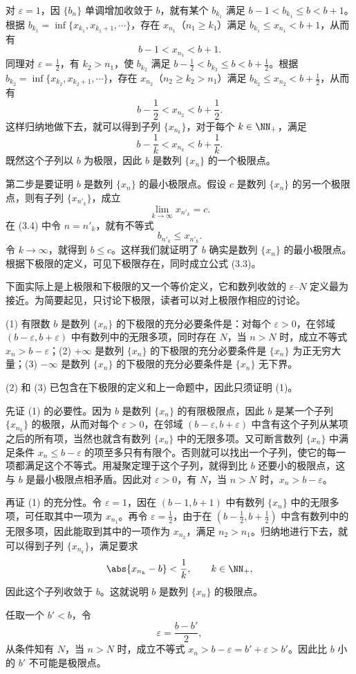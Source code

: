 \begin{xproof}
对 $\varepsilon=1$，因 $\{b_n\}$ 单调增加收敛于 $b$，就有某个 $b_{k_1}$ 满足 $b-1<b_{k_1}\leqslant b<b+1$。根据 $b_{k_1}=\inf\{x_{k_1},x_{k_1+1},\cdots\}$，存在 $x_{n_1}$（$n_1\geqslant k_1$）满足 $b_{k_1}\leqslant x_{n_1}<b+1$，从而有
\[
  b-1<x_{n_1}<b+1.
\]
同理对 $\varepsilon=\frac12$，有 $k_2>n_1$，使 $b_{k_2}$ 满足 $b-\frac12<b_{k_2}\leqslant b<b+\frac12$。根据 $b_{k_2}=\inf\{x_{k_2},x_{k_2+1},\cdots\}$，存在 $x_{n_2}$（$n_2\geqslant k_2>n_1$）满足 $b_{k_2}\leqslant x_{n_2}<b+\frac12$，从而有
\[
  b-\frac12<x_{n_2}<b+\frac12.
\]
这样归纳地做下去，就可以得到子列 $\{x_{n_k}\}$，对于每个 $k\in\NN_+$，满足
\[
  b-\frac1k<x_{n_k}<b+\frac1k.
\]
既然这个子列以 $b$ 为极限，因此 $b$ 是数列 $\{x_n\}$ 的一个极限点。

第二步是要证明 $b$ 是数列 $\{x_n\}$ 的最小极限点。假设 $c$ 是数列 $\{x_n\}$ 的另一个极限点，则有子列 $\{x_{n'_k}\}$，成立
\[
  \lim_{k\to\infty}x_{n'_k}=c.
\]
在 (3.4) 中令 $n=n'_k$，就有不等式
\[
  b_{n'_k}\leqslant x_{n'_k}.
\]
令 $k\to\infty$，就得到 $b\leqslant c$。这样我们就证明了 $b$ 确实是数列 $\{x_n\}$ 的最小极限点。根据下极限的定义，可见下极限存在，同时成立公式 (3.3)。
\end{xproof}

下面实际上是上极限和下极限的又一个等价定义，它和数列收敛的 $\varepsilon$--$N$ 定义最为接近。为简要起见，只讨论下极限，读者可以对上极限作相应的讨论。

\begin{xproposition}[3.6.3]
(1) 有限数 $b$ 是数列 $\{x_n\}$ 的下极限的充分必要条件是：对每个 $\varepsilon>0$，在邻域 $(b-\varepsilon,b+\varepsilon)$ 中有数列中的无限多项，同时存在 $N$，当 $n>N$ 时，成立不等式 $x_n>b-\varepsilon$；(2) $+\infty$ 是数列 $\{x_n\}$ 的下极限的充分必要条件是 $\{x_n\}$ 为正无穷大量；(3) $-\infty$ 是数列 $\{x_n\}$ 的下极限的充分必要条件是 $\{x_n\}$ 无下界。
\end{xproposition}
\begin{xproof}
(2) 和 (3) 已包含在下极限的定义和上一命题中，因此只须证明 (1)。

先证 (1) 的必要性。因为 $b$ 是数列 $\{x_n\}$ 的有限极限点，因此 $b$ 是某一个子列 $\{x_{n_k}\}$ 的极限，从而对每个 $\varepsilon>0$，在邻域 $(b-\varepsilon,b+\varepsilon)$ 中含有这个子列从某项之后的所有项，当然也就含有数列 $\{x_n\}$ 中的无限多项。又可断言数列 $\{x_n\}$ 中满足条件 $x_n\leqslant b-\varepsilon$ 的项至多只有有限个。否则就可以找出一个子列，使它的每一项都满足这个不等式。用凝聚定理于这个子列，就得到比 $b$ 还要小的极限点，这与 $b$ 是最小极限点相矛盾。因此对 $\varepsilon>0$，有 $N$，当 $n>N$ 时，$x_n>b-\varepsilon$。

再证 (1) 的充分性。令 $\varepsilon=1$，因在 $(b-1,b+1)$ 中有数列 $\{x_n\}$ 中的无限多项，可任取其中一项为 $x_{n_1}$。再令 $\varepsilon=\frac12$，由于在 $(b-\frac12,b+\frac12)$ 中含有数列中的无限多项，因此能取到其中的一项作为 $x_{n_2}$，满足 $n_2>n_1$。归纳地进行下去，就可以得到子列 $\{x_{n_k}\}$，满足要求
\[
  \abs{x_{n_k}-b}<\frac1k,\qquad k\in\NN_+,
\]
因此这个子列收敛于 $b$。这就说明 $b$ 是数列 $\{x_n\}$ 的极限点。

任取一个 $b'<b$，令
\[
  \varepsilon=\frac{b-b'}2,
\]
从条件知有 $N$，当 $n>N$ 时，成立不等式 $x_n>b-\varepsilon=b'+\varepsilon>b'$。因此比 $b$ 小的 $b'$ 不可能是极限点。
\end{xproof}

